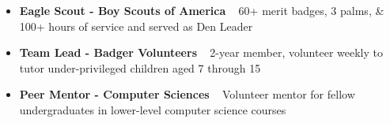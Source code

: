 \documentclass[10pt, letterpaper]{awesome-cv}
\newcommand{\skill}[2]
{\skilltypestyle{#1} \ \skillsetstyle{#2}}
\renewcommand*{\skilltypestyle}[1]{{\bodyfont\bfseries\color{darktext} #1}}
\renewcommand*{\skillsetstyle}[1]{{\bodyfont\color{text} #1}}
\begin{document}
\vspace*{-2mm}
\vspace*{-3mm}
\begin{itemize}[noitemsep, leftmargin=0em,label={}]
    \item \skill{Eagle Scout - Boy Scouts of America}
    {60+ merit badges, 3 palms, \& 100+ hours of service and served as Den Leader}
    \item \skill{Team Lead - Badger Volunteers}
    {2-year member, volunteer weekly to tutor under-privileged children aged 7 through 15}
\item \skill{Peer Mentor - Computer Sciences}{Volunteer mentor for fellow undergraduates in lower-level computer science courses}
\end{itemize}
\end{document}
